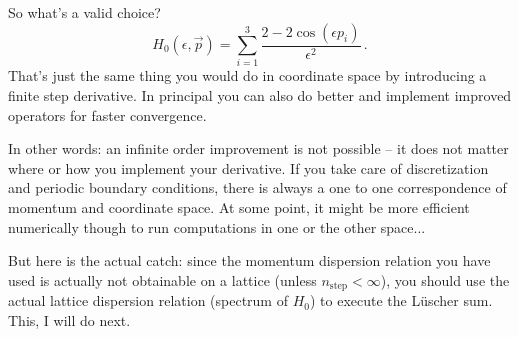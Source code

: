 \documentclass[
    aps,
    prl,
    showkeys,
    nofootinbib,
    floatfix
]{revtex4-1}
\begin{document}
So what's a valid choice?
\begin{equation}
	H_0(\epsilon, \vec p) = \sum_{i=1}^3 \frac{2 - 2 \cos(\epsilon p_i)}{\epsilon^2} \, .
\end{equation}
That's just the same thing you would do in coordinate space by introducing a finite step derivative.
In principal you can also do better and implement improved operators for faster convergence.

In other words: an infinite order improvement is not possible -- it does not matter where or how you implement your derivative.
If you take care of discretization and periodic boundary conditions, there is always a one to one correspondence of momentum and coordinate space.
At some point, it might be more efficient numerically though to run computations in one or the other space...

But here is the actual catch: since the momentum dispersion relation you have used is actually not obtainable on a lattice (unless $n_{\mathrm{step}} < \infty$), you should use the actual lattice dispersion relation (spectrum of $H_0$) to execute the Lüscher sum.
This, I will do next.
\end{document}
